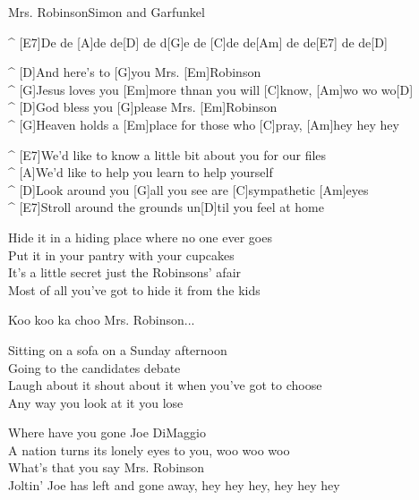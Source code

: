 \begin{song}{Mrs. Robinson}{Simon and Garfunkel}


\begin{guitar}
^ [E7]De de [A]de de[D] de d[G]e de [C]de de[Am] de de[E7] de de[D]\\
\end{guitar}

\begin{guitar}
^ [D]And here's to [G]you Mrs. [Em]Robinson\\
^ [G]Jesus loves you [Em]more thnan you will [C]know, [Am]wo wo wo[D]\\
^ [D]God bless you [G]please Mrs. [Em]Robinson\\
^ [G]Heaven holds a [Em]place for those who [C]pray, [Am]hey hey hey\\
\end{guitar}

\begin{guitar}
^ [E7]We'd like to know a little bit about you for our files\\
^ [A]We'd like to help you learn to help yourself\\
^ [D]Look around you [G]all you see are [C]sympathetic [Am]eyes\\
^ [E7]Stroll around the grounds un[D]til you feel at home\\
\end{guitar}



\begin{guitar}
Hide it in a hiding place where no one ever goes\\
Put it in your pantry with your cupcakes\\
It's a little secret just the Robinsons' afair\\
Most of all you've got to hide it from the kids\\
\end{guitar}


\begin{guitar}
Koo koo ka choo Mrs. Robinson...\\
\end{guitar}

\begin{guitar}
Sitting on a sofa on a Sunday afternoon\\
Going to the candidates debate\\
Laugh about it shout about it when you've got to choose\\
Any way you look at it you lose\\
\end{guitar}

\begin{guitar}
Where have you gone Joe DiMaggio\\
A nation turns its lonely eyes to you, woo woo woo\\
What's that you say Mrs. Robinson\\
Joltin' Joe has left and gone away, hey hey hey, hey hey hey\\
\end{guitar}
\end{song}
